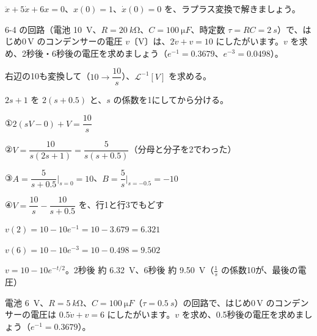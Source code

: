 \begin{jibun}
$\ddot x+5\dot x+6x=0$、$x(0)=1$、$\dot x(0)=0$ を、ラプラス変換で解きましょう。
\end{jibun}

\begin{reidai}[RC 回路の充電]
6-4 の回路（電池 \qty{10}{V}、$R=\qty{20}{k\ohm}$、$C=\qty{100}{\micro F}$、時定数 $\tau=RC=\qty{2}{s}$）で、はじめ0\,V のコンデンサーの電圧 $v$〔V〕は、$2\dot v+v=10$ にしたがいます。$v$ を求め、2秒後・6秒後の電圧を求めましょう（$e^{-1}=0.3679$、$e^{-3}=0.0498$）。\par
\kangaekata {}\par
{}\enspace 右辺の10も変換して（$10\to\dfrac{10}{s}$）、$\mathcal L^{-1}[V]$ を求める。\par
{}\enspace $2s+1$ を $2(s+0.5)$ と、$s$ の係数を1にしてから分ける。\par
\shiki\kixhs{}\zw{} ①\enspace $2(sV-0)+V=\dfrac{10}{s}$\par
\kixha ②\enspace $V=\dfrac{10}{s(2s+1)}=\dfrac{5}{s(s+0.5)}$\quad （分母と分子を2でわった）\par
\kixha ③\enspace $A=\dfrac{5}{s+0.5}\Big|_{s=0}=10$、\quad $B=\dfrac{5}{s}\Big|_{s=-0.5}=-10$\par
\kixha ④\enspace $V=\dfrac{10}{s}-\dfrac{10}{s+0.5}$ を、行1と行3でもどす\par
\kixha $v(2)=10-10e^{-1}=10-3.679=6.321$\par
\kixha $v(6)=10-10e^{-3}=10-0.498=9.502$\par
\kotae $v=10-10e^{-t/2}$。2秒後 約 \qty{6.32}{V}、6秒後 約 \qty{9.50}{V}（$\frac1s$ の係数10が、最後の電圧）
\end{reidai}

\begin{jibun}
電池 \qty{6}{V}、$R=\qty{5}{k\ohm}$、$C=\qty{100}{\micro F}$（$\tau=\qty{0.5}{s}$）の回路で、はじめ0\,V のコンデンサーの電圧は $0.5\dot v+v=6$ にしたがいます。$v$ を求め、0.5秒後の電圧を求めましょう（$e^{-1}=0.3679$）。
\end{jibun}

